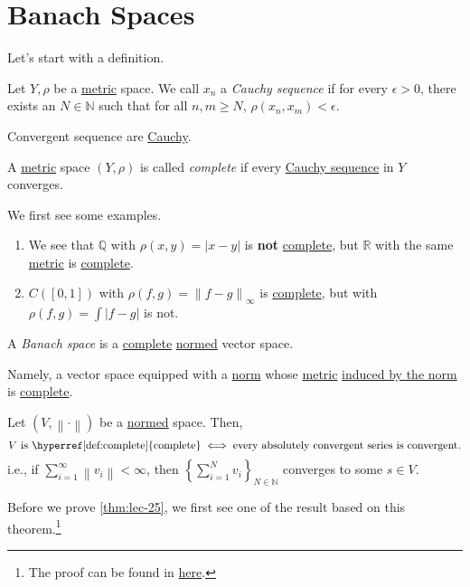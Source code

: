 \section{Banach Spaces}
Let's start with a definition.
\begin{definition}\label{def:Cauchy-sequence}
	Let \(Y, \rho \) be a \hyperref[def:metric]{metric} space. We call \(x_{n} \) a \emph{Cauchy sequence} if for every \(\epsilon >0\), there exists an
	\(N\in \mathbb{N} \) such that for all \(n, m\geq N\), \(\rho (x_{n} , x_{m} )< \epsilon \).
\end{definition}
\begin{note}
	Convergent sequence are \hyperref[def:Cauchy-sequence]{Cauchy}.
\end{note}

\begin{definition}[Complete]\label{def:complete}
	A \hyperref[def:metric]{metric} space \((Y, \rho )\) is called \emph{complete} if every \hyperref[def:Cauchy-sequence]{Cauchy sequence} in \(Y\) converges.
\end{definition}

\begin{eg}
	We first see some examples.
	\begin{enumerate}[(1)]
		\item We see that \(\mathbb{Q} \) with \(\rho (x, y) = \left\vert x - y \right\vert \) is \textbf{not} \hyperref[def:complete]{complete}, but \(\mathbb{R} \) with
		      the same \hyperref[def:metric]{metric} is \hyperref[def:complete]{complete}.
		\item \(C([0, 1])\) with \(\rho (f, g) = \left\lVert f-g\right\rVert _\infty \) is \hyperref[def:complete]{complete}, but with \(\rho (f, g) = \int \left\vert f-g \right\vert \) is not.
	\end{enumerate}
\end{eg}

\begin{definition}\label{def:Banach-space}
	A \emph{Banach space} is a \hyperref[def:complete]{complete} \hyperref[def:norm]{normed} vector space.
\end{definition}
\begin{remark}
	Namely, a vector space equipped with a \hyperref[def:norm]{norm} whose \hyperref[def:metric]{metric} \hyperref[induced-metric]{induced by the norm} is
	\hyperref[def:complete]{complete}.
\end{remark}

\begin{theorem}\label{thm:lec-25}
	Let \((V, \left\lVert \cdot\right\rVert )\) be a \hyperref[def:norm]{normed} space. Then,
	\[
		\text{\(V\) is \hyperref[def:complete]{complete}} \iff \text{every absolutely convergent series is convergent}.
	\]
	i.e., if \(\sum_{i=1}^{\infty} \left\lVert v_{i} \right\rVert<\infty\), then \(\left\{\sum_{i=1}^{N} v_{i} \right\}_{N\in \mathbb{N} }\)
	converges to some \(s\in V\).
\end{theorem}
Before we prove \autoref{thm:lec-25}, we first see one of the result based on this theorem.\footnote{The proof can be found in \hyperref[pf:thm:lec25]{here}.}

